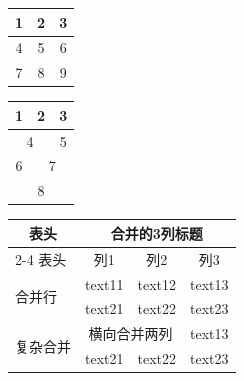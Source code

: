 \documentclass{ctexart}
\begin{document}
\begin{center}
    \begin{tabular}{|c|c|c|}
        \hline
        1&2&3 \\ \hline
        4&5&6 \\ \hline
        7&8&9 \\ \hline
    \end{tabular}
\end{center}

\begin{center}
    \begin{tabular}{|c|c|c|}
        \hline
        1&2&3 \\ \hline
        \multicolumn{2}{|c|}{4} &5 \\ \hline
        6& \multicolumn{2}{|c|}{7} \\ \hline
        \multicolumn{3}{|c|}{8} \\ \hline
    \end{tabular}
\end{center}

\begin{center}
    \begin{tabular}{|l|c|c|c|}
        \toprule
        \multicolumn{1}{c}{表头} & \multicolumn{3}{c}{合并的3列标题} \\
        \cmidrule(lr){2-4}  %
        表头 & 列1 & 列2 & 列3 \\
        \midrule
        
        \multirow{2}{*}{合并行} & text11 & text12 & text13 \\
                                & text21 & text22 & text23 \\
        
        \midrule
        
        \multirow{2}{*}{复杂合并} & \multicolumn{2}{c}{横向合并两列} & text13 \\
        \cmidrule(lr){2-3}
                                  & text21 & text22 & text23 \\
        
        \bottomrule
    \end{tabular}
\end{center}
\end{document}
